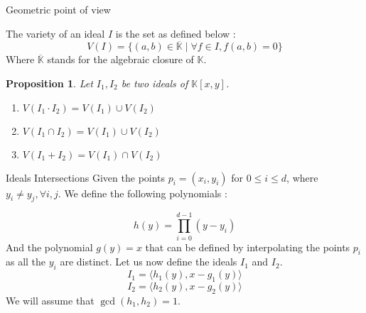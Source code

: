 \documentclass{beamer}
\newtheorem{proposition}{Proposition}[section]
\begin{document}
\begin{frame}{Geometric point of view}
    \begin{definition} 
        The variety of an ideal $I$ is the set as defined below :
        \begin{displaymath}
            V(I) = \{ (a, b) \in \overline{\mathbb{K}} \mid \forall f \in I, f(a, b) = 0 \}
        \end{displaymath}
        Where $\overline{\mathbb{K}}$ stands for the algebraic closure of $\mathbb{K}$.
    \end{definition}
    \begin{proposition}
        Let $I_{1}, I_{2}$ be two ideals of $\mathbb{K}[x, y]$.
        \begin{enumerate}
            \item[(i)] $V(I_{1} \cdot I_{2}) = V(I_{1}) \cup V(I_{2})$
            \item[(ii)] $V(I_{1} \cap I_{2}) = V(I_{1}) \cup V(I_{2})$
            \item[(iii)] $V(I_{1} + I_{2}) = V(I_{1}) \cap V(I_{2})$
        \end{enumerate}
    \end{proposition}
\end{frame}




\begin{frame}{Ideals Intersections}
    Given the points $p_{i} = (x_{i}, y_{i})$ for $0 \leq i \leq d$, where $y_{i} \neq y_{j}, \forall i, j$. 
    We define the following polynomials : 
    
    \begin{displaymath}
        h(y) = \prod_{i=0}^{d-1} (y - y_{i}) 
    \end{displaymath}
    And the polynomial $g(y) = x$ that can be defined by interpolating the points $p_{i}$ as all the $y_{i}$ are distinct.
    Let us now define the ideals $I_{1}$ and $I_{2}$.
    \begin{displaymath}
        I_{1} = \langle h_{1}(y), x - g_{1}(y) \rangle
    \end{displaymath}
    \begin{displaymath}
        I_{2} = \langle h_{2}(y), x - g_{2}(y) \rangle
    \end{displaymath}
    We will assume that $\gcd(h_{1}, h_{2}) = 1$.
\end{frame}
\end{document}
